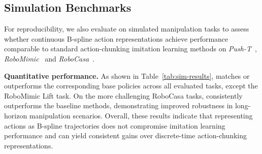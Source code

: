 \vspace{-10pt}
\subsection{Simulation Benchmarks}
\vspace{-5pt}

For reproducibility, we also evaluate \our on simulated manipulation tasks to assess whether continuous B-spline action representations achieve performance comparable to standard action-chunking imitation learning methods on \textit{Push-T}~\cite{florence2022implicit,dp}, \textit{RoboMimic}~\cite{robomimic2021} and \textit{RoboCasa}~\cite{nasiriany2024robocasa}.



\noindent\textbf{Quantitative performance.}
As shown in Table~\ref{tab:sim-results}, \our matches or outperforms the corresponding base policies across all evaluated tasks, except the RoboMimic Lift task.
%
On the more challenging RoboCasa tasks, \our consistently outperforms the baseline methods, demonstrating improved robustness in long-horizon manipulation scenarios.
Overall, these results indicate that representing actions as B-spline trajectories does not compromise imitation learning performance and can yield consistent gains over discrete-time action-chunking representations. 

